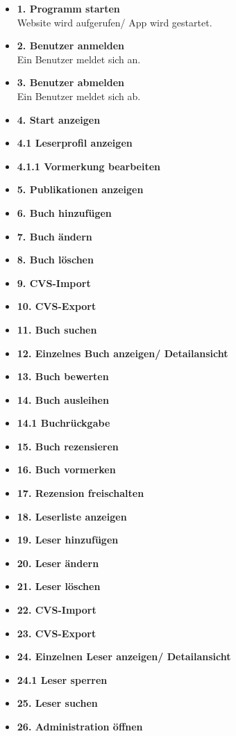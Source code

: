\documentclass[fontsize=12pt,paper=a4,twoside]{scrartcl}
\begin{document}
\begin{itemize}
  \item \textbf{1. Programm starten}\\
  Website wird aufgerufen/ App wird gestartet. 
  \item \textbf{2. Benutzer anmelden}\\
  Ein Benutzer meldet sich an.
  \item \textbf{3. Benutzer abmelden} \\
  Ein Benutzer meldet sich ab.
  \item \textbf{4. Start anzeigen}
  \item \textbf{4.1 Leserprofil anzeigen}
  \item \textbf{4.1.1 Vormerkung bearbeiten}
  \item \textbf{5. Publikationen anzeigen}
  \item \textbf{6. Buch hinzufügen}
  \item \textbf{7. Buch ändern}
  \item \textbf{8. Buch löschen}
  \item \textbf{9. CVS-Import}
  \item \textbf{10. CVS-Export}
  \item \textbf{11. Buch suchen}
  \item \textbf{12. Einzelnes Buch anzeigen/ Detailansicht}
  \item \textbf{13. Buch bewerten}
  \item \textbf{14. Buch ausleihen}
  \item \textbf{14.1 Buchrückgabe}
  \item \textbf{15. Buch rezensieren}
  \item \textbf{16. Buch vormerken}
  \item \textbf{17. Rezension freischalten}
  \item \textbf{18. Leserliste anzeigen}
  \item \textbf{19. Leser hinzufügen}
  \item \textbf{20. Leser ändern}
  \item \textbf{21. Leser löschen}
  \item \textbf{22. CVS-Import}
  \item \textbf{23. CVS-Export}
  \item \textbf{24. Einzelnen Leser anzeigen/ Detailansicht}
  \item \textbf{24.1 Leser sperren}
  \item \textbf{25. Leser suchen}
  \item \textbf{26. Administration öffnen}

\end{itemize}
\end{document}

